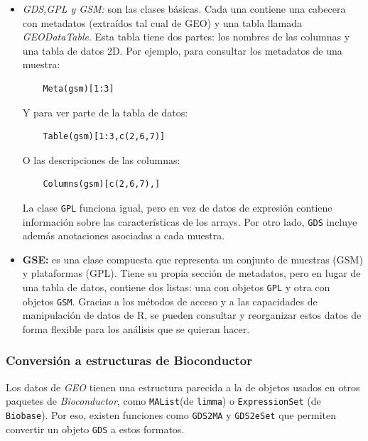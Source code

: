 \begin{itemize}
    \item \textit{GDS,GPL y GSM:} son las clases básicas. Cada una contiene una cabecera con metadatos (extraídos tal cual de GEO) y una tabla llamada 
    \textit{GEODataTable}. Esta tabla tiene dos partes: los nombres de las columnas y una tabla de datos 2D. Por ejemplo, para consultar los metadatos de una
    muestra:
    \begin{verbatim}
    Meta(gsm)[1:3]
    \end{verbatim}

    Y para ver parte de la tabla de datos:

    \begin{verbatim}
    Table(gsm)[1:3,c(2,6,7)]
    \end{verbatim}

    O las descripciones de las columnas:

    \begin{verbatim}
    Columns(gsm)[c(2,6,7),]
    \end{verbatim}

    La clase \texttt{GPL} funciona igual, pero en vez de datos de expresión contiene información sobre las características de los arrays. Por otro lado, \texttt{GDS} 
    incluye además anotaciones asociadas a cada muestra.

    \item \textbf{GSE:} es una clase compuesta que representa un conjunto de muestras (GSM) y plataformas (GPL). Tiene su propia sección de metadatos, pero en 
    lugar de una tabla de datos, contiene dos listas: una con objetos \texttt{GPL} y otra con objetos \texttt{GSM}. Gracias a los métodos de acceso y a las capacidades 
    de manipulación de datos de R, se pueden consultar y reorganizar estos datos de forma flexible para los análisis que se quieran hacer.
\end{itemize}

\subsubsection{Conversión a estructuras de Bioconductor}

Los datos de \textit{GEO} tienen una estructura parecida a la de objetos usados en otros paquetes de \textit{Bioconductor}, como \texttt{MAList}(de \texttt{limma}) o 
\texttt{ExpressionSet} (de \texttt{Biobase}). Por eso, existen funciones como \texttt{GDS2MA} y \texttt{GDS2eSet} que permiten convertir un objeto \texttt{GDS} a estos 
formatos. \newline

